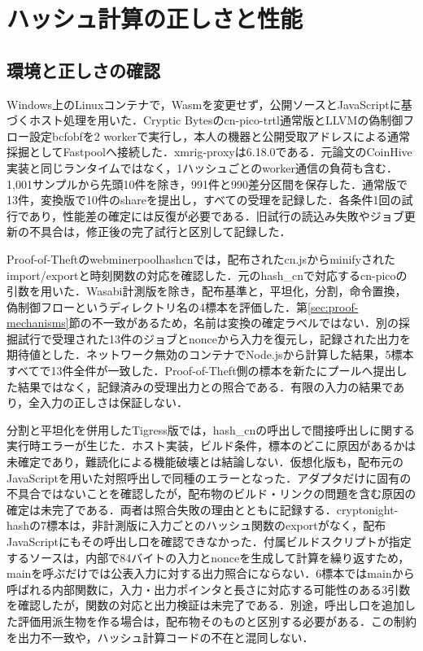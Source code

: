 \documentclass[submit,techrep]{ipsj}
\begin{document}
\section{ハッシュ計算の正しさと性能}
\label{sec:runtime}
\subsection{環境と正しさの確認}
Windows上のLinuxコンテナで，Wasmを変更せず，公開ソースとJavaScriptに基づくホスト処理を用いた．Cryptic Bytesのcn-pico-trtl通常版とLLVMの偽制御フロー設定bcfobfを2 workerで実行し，本人の機器と公開受取アドレスによる通常採掘としてFastpoolへ接続した．xmrig-proxyは6.18.0である．元論文のCoinHive実装と同じランタイムではなく，1ハッシュごとのworker通信の負荷も含む．1,001サンプルから先頭10件を除き，991件と990差分区間を保存した．通常版で13件，変換版で10件のshareを提出し，すべての受理を記録した．各条件1回の試行であり，性能差の確定には反復が必要である．旧試行の読込み失敗やジョブ更新の不具合は，修正後の完了試行と区別して記録した．

Proof-of-Theftのwebminerpoolhashcnでは，配布されたcn.jsからminifyされたimport/exportと時刻関数の対応を確認した．元のhash\_cnで対応するcn-picoの引数を用いた．Wasabi計測版を除き，配布基準と，平坦化，分割，命令置換，偽制御フローというディレクトリ名の4標本を評価した．第\ref{sec:proof-mechanisms}節の不一致があるため，名前は変換の確定ラベルではない．別の採掘試行で受理された13件のジョブとnonceから入力を復元し，記録された出力を期待値とした．ネットワーク無効のコンテナでNode.jsから計算した結果，5標本すべてで13件全件が一致した．Proof-of-Theft側の標本を新たにプールへ提出した結果ではなく，記録済みの受理出力との照合である．有限の入力の結果であり，全入力の正しさは保証しない．

分割と平坦化を併用したTigress版では，hash\_cnの呼出しで間接呼出しに関する実行時エラーが生じた．ホスト実装，ビルド条件，標本のどこに原因があるかは未確定であり，難読化による機能破壊とは結論しない．仮想化版も，配布元のJavaScriptを用いた対照呼出しで同種のエラーとなった．アダプタだけに固有の不具合ではないことを確認したが，配布物のビルド・リンクの問題を含む原因の確定は未完了である．両者は照合失敗の理由とともに記録する．cryptonight-hashの7標本は，非計測版に入力ごとのハッシュ関数のexportがなく，配布JavaScriptにもその呼出し口を確認できなかった．付属ビルドスクリプトが指定するソースは，内部で84バイトの入力とnonceを生成して計算を繰り返すため，mainを呼ぶだけでは公表入力に対する出力照合にならない．6標本ではmainから呼ばれる内部関数に，入力・出力ポインタと長さに対応する可能性のある3引数を確認したが，関数の対応と出力検証は未完了である．別途，呼出し口を追加した評価用派生物を作る場合は，配布物そのものと区別する必要がある．この制約を出力不一致や，ハッシュ計算コードの不在と混同しない．
\end{document}
